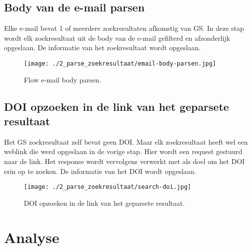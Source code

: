 \subsection{Body van de e-mail parsen}
Elke e-mail bevat 1 of meerdere zoekresultaten afkomstig van GS. In deze stap wordt elk zoekresultaat uit de body van de e-mail gefilterd en afzonderlijk opgeslaan.
De informatie van het zoekresultaat wordt opgeslaan.
\begin{figure}[h!]
    \centering
    \texttt{[image: ./2\_parse\_zoekresultaat/email-body-parsen.jpg]}
    \caption[E-mail body parsen.]{\label{fig:E-mail body parsen}Flow e-mail body parsen.}
\end{figure}
\subsection{DOI opzoeken in de link van het geparsete resultaat}
Het GS zoekresultaat zelf bevat geen DOI. Maar elk zoekresultaat heeft wel een weblink die werd opgeslaan in de vorige stap. Hier wordt een request gestuurd naar de link. Het response wordt vervolgens verwerkt met als doel om het DOI erin op te zoeken. De informatie van het DOI wordt opgeslaan.
\begin{figure}[h!]
    \centering
    \texttt{[image: ./2\_parse\_zoekresultaat/search-doi.jpg]}
    \caption[DOI opzoeken in de link van het geparsete resultaat.]{\label{fig:E-mail search DOI}DOI opzoeken in de link van het geparsete resultaat.}
\end{figure}
\section{Analyse}
